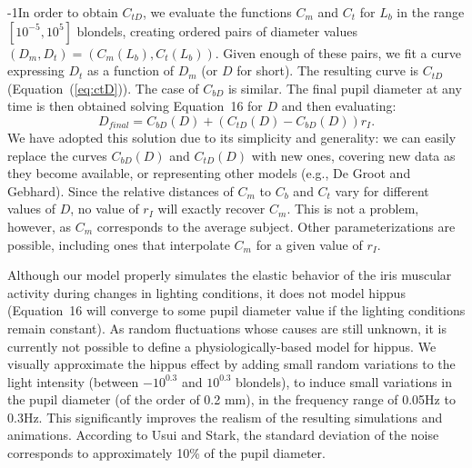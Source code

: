 \documentclass{acmtog} %
\begin{document}
\looseness-1In order to obtain $C_{tD}$, we evaluate the functions $C_m$
and $C_t$ for $L_b$ in the range $[10^{-5}, 10^5]$ blondels, creating
ordered pairs of diameter values $(D_m, D_t) = (C_m(L_b), C_t(L_b))$.
Given enough of these pairs, we fit a curve expressing $D_t$ as a
function of $D_m$ (or $D$ for short). The resulting curve is $C_{tD}$
(Equation~(\ref{eq:ctD})). The case of $C_{bD}$ is similar. The final
pupil diameter at any time is then obtained solving Equation~16 for $D$
and then evaluating:
\begin{equation}
\label{eq:isocurve}
D_{final} = C_{bD}(D) + (C_{tD}(D) - C_{bD}(D)) r_I.
\end{equation}
We have adopted this solution due to its simplicity and generality: we
can easily replace the curves $C_{bD}(D)$ and $C_{tD}(D)$ with new ones,
covering new data as they become available, or representing other models
(e.g., De Groot and Gebhard). Since the relative distances of $C_m$ to
$C_b$ and $C_t$ vary for different values of $D$, no value of $r_I$ will
exactly recover $C_m$. This is not a problem, however, as $C_m$
corresponds to the average subject. Other parameterizations are
possible, including ones that interpolate $C_m$ for a given value of
$r_I$.

Although our model properly simulates the elastic behavior of the iris
muscular activity during changes in lighting conditions, it does not
model hippus (Equation~16 will converge to some pupil diameter value if
the lighting conditions remain constant). As random fluctuations whose
causes are still unknown, it is currently not possible to define a
physiologically-based model for hippus. We visually approximate the
hippus effect by adding small random variations to the light intensity
(between $-10^{0.3}$ and $10^{0.3}$ blondels), to induce small
variations in the pupil diameter (of the order of 0.2 mm), in the
frequency range of 0.05Hz to 0.3Hz. This significantly improves the
realism of the resulting simulations and animations. According to Usui
and Stark, the standard deviation of the noise corresponds to
approximately 10\% of the pupil diameter.
\end{document}
